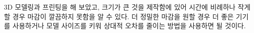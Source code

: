 \documentclass[a4paper, 10pt, nanum]{CSUniSchoolLabReport}
\begin{document}
	3D 모델링과 프린팅을 해 보았고, 크기가 큰 것을 제작함에 있어 시간에 비례하나 작게할 경우 마감이 깔끔하지 못함을 알 수 있다. 더 정밀한 마감을 원할 경우 더 좋은 기기를 사용하거나 모델 사이즈를 키워 상대적 오차를 줄이는 방법을 사용하면 될 것이다.



\end{document}
